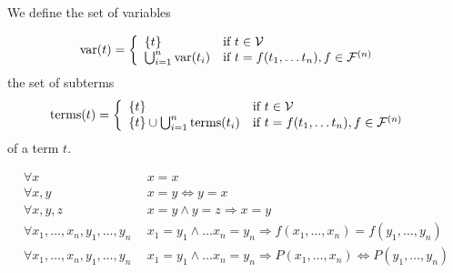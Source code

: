 
\begin{definition}We define the set of variables
	
	\begin{align*}
		\operatorname{var}(t) &= \left\{\begin{array}{ll}
			\{ t \} & \text{if } t \in {\mathcal V} \\
			\bigcup_{i=1}^n \operatorname{var}(t_i) & \text{if }  t = f(t_1, \ldots t_n), f \in {\mathcal F^{(n)}}
		\end{array}\right.	
	\end{align*}
	the set of subterms
	\begin{align*}
	\operatorname{terms}(t) &= \left\{\begin{array}{ll}
	\{ t \} & \text{if } t \in {\mathcal V} \\
	\{ t \} \cup \bigcup_{i=1}^n \operatorname{terms}(t_i) & \text{if }  t = f(t_1, \ldots t_n), f \in {\mathcal F^{(n)}}
	\end{array}\right.	
	\end{align*}
	of a term $t$.
	
\end{definition}


	\begin{align*}
	\forall x\ &\ x = x \\
	\forall x,y\ &\ x = y \Leftrightarrow y = x \\
	\forall x,y,z\ &\ x = y \land y = z \Rightarrow x = y \\
	\forall x_1,\ldots,x_n,y_1,\ldots,y_n\ &\ x_1=y_1\land\ldots x_n=y_n\Rightarrow f(x_1,\ldots,x_n)=f(y_1,\ldots,y_n) \\
	\forall x_1,\ldots,x_n,y_1,\ldots,y_n\ &\ x_1=y_1\land\ldots x_n=y_n\Rightarrow P(x_1,\ldots,x_n)\Leftrightarrow P(y_1,\ldots,y_n) \\
	\end{align*}

